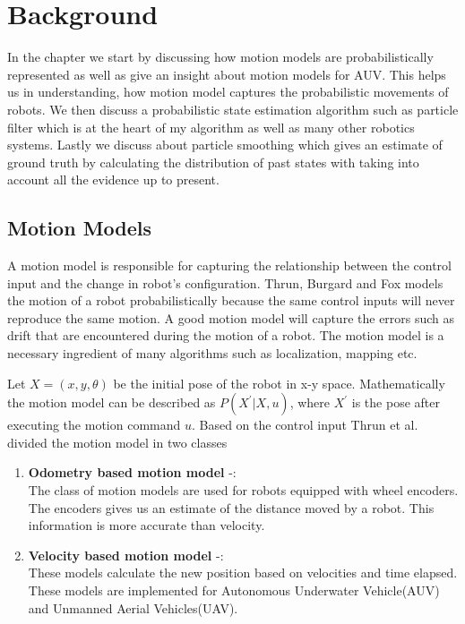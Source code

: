 \documentclass[12pt]{dalcsthesis}
\begin{document}
\chapter{Background}
In the chapter we start by discussing how motion models are probabilistically represented as well as give an insight about motion models for AUV. This helps us in understanding, how motion model captures the probabilistic movements of robots. We then discuss a probabilistic state estimation algorithm such as particle filter \cite{ristic2004beyond} \cite{chen2003bayesian} which is at the heart of my algorithm as well as many other robotics systems. Lastly we discuss about particle smoothing \cite{doucet2000monte} \cite{doucet2009tutorial} which gives an estimate of ground truth by calculating the distribution of past states with taking into account all the evidence up to present. 

\section{Motion Models}
\label{chap-:Motion Model}
A motion model is responsible for capturing the relationship between the control input and the change in robot's configuration. Thrun, Burgard and Fox \cite{thrun2005probabilistic} models the motion of a robot probabilistically because the same
control inputs will never reproduce the same motion. A good motion model will capture the errors such as drift that are encountered during the motion of a robot. The motion model is a necessary ingredient of many algorithms such as localization, mapping etc. 

Let $X=(x,y,\theta)$ be the initial pose of the robot in x-y space. Mathematically the motion model can be described as $P(X^{'}|X,u)$, where $X^{'}$ is the pose after executing the motion command $u$. Based on the control input Thrun et al.\ \cite{thrun2005probabilistic} divided the motion model in two classes
\begin{enumerate}
\item \textbf{Odometry based motion model} -: \\
The class of motion models are used for robots equipped with wheel encoders. The encoders gives us an estimate of the distance moved by a robot. This information is more accurate than velocity.  

\item \textbf{Velocity based motion model} -: \\
These models calculate the new position based on velocities and time elapsed. These models are implemented for Autonomous Underwater Vehicle(AUV) and Unmanned Aerial Vehicles(UAV). 
\end{enumerate}
\end{document}
